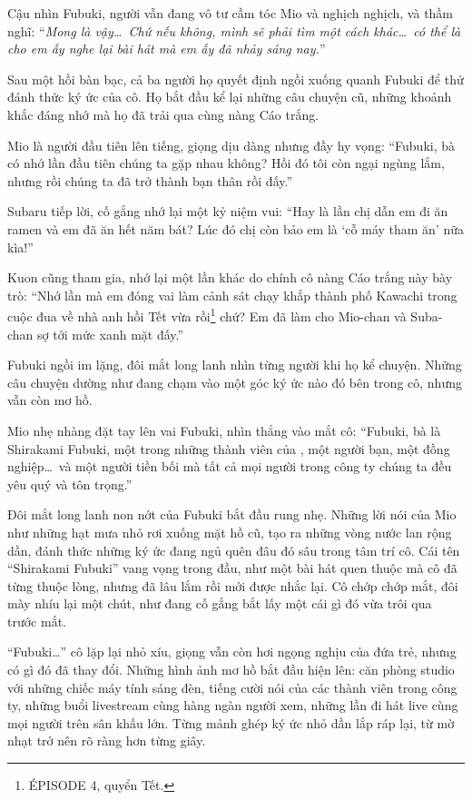 \documentclass[../main.tex]{subfiles}
\begin{document}
Cậu nhìn Fubuki, người vẫn đang vô tư cầm tóc Mio và nghịch nghịch, và thầm nghĩ: ``\textit{Mong là vậy\dots\ Chứ nếu không, mình sẽ phải tìm một cách khác\dots\ có thể là cho em ấy nghe lại bài hát mà em ấy đã nhảy sáng nay.}''

\ct

Sau một hồi bàn bạc, cả ba người họ quyết định ngồi xuống quanh Fubuki để thử đánh thức ký ức của cô. Họ bắt đầu kể lại những câu chuyện cũ, những khoảnh khắc đáng nhớ mà họ đã trải qua cùng nàng Cáo trắng.

Mio là người đầu tiên lên tiếng, giọng dịu dàng nhưng đầy hy vọng: ``Fubuki, bà có nhớ lần đầu tiên chúng ta gặp nhau không? Hồi đó tôi còn ngại ngùng lắm, nhưng rồi chúng ta đã trở thành bạn thân rồi đấy.''

Subaru tiếp lời, cố gắng nhớ lại một kỷ niệm vui: ``Hay là lần chị dẫn em đi ăn ramen và em đã ăn hết năm bát? Lúc đó chị còn bảo em là `cỗ máy tham ăn' nữa kìa!''

Kuon cũng tham gia, nhớ lại một lần khác do chính cô nàng Cáo trắng này bày trò: ``Nhớ lần mà em đóng vai làm cảnh sát chạy khắp thành phố Kawachi trong cuộc đua về nhà anh hồi Tết vừa rồi\footnote{{ÉPISODE 4}, quyển Tết.} chứ? Em đã làm cho Mio-chan và Suba-chan sợ tới mức xanh mặt đấy.''

Fubuki ngồi im lặng, đôi mắt long lanh nhìn từng người khi họ kể chuyện. Những câu chuyện dường như đang chạm vào một góc ký ức nào đó bên trong cô, nhưng vẫn còn mơ hồ.

Mio nhẹ nhàng đặt tay lên vai Fubuki, nhìn thẳng vào mắt cô: ``Fubuki, bà là Shirakami Fubuki, một trong những thành viên của \hll, một người bạn, một đồng nghiệp\dots\ và một người tiền bối mà tất cả mọi người trong công ty chúng ta đều yêu quý và tôn trọng.''

Đôi mắt long lanh non nớt của Fubuki bắt đầu rung nhẹ. Những lời nói của Mio như những hạt mưa nhỏ rơi xuống mặt hồ cũ, tạo ra những vòng nước lan rộng dần, đánh thức những ký ức đang ngủ quên đâu đó sâu trong tâm trí cô. Cái tên ``Shirakami Fubuki'' vang vọng trong đầu, như một bài hát quen thuộc mà cô đã từng thuộc lòng, nhưng đã lâu lắm rồi mới được nhắc lại. Cô chớp chớp mắt, đôi mày nhíu lại một chút, như đang cố gắng bắt lấy một cái gì đó vừa trôi qua trước mắt.

``Fubuki\dots'' cô lặp lại nhỏ xíu, giọng vẫn còn hơi ngọng nghịu của đứa trẻ, nhưng có gì đó đã thay đổi. Những hình ảnh mơ hồ bắt đầu hiện lên: căn phòng studio với những chiếc máy tính sáng đèn, tiếng cười nói của các thành viên trong công ty, những buổi livestream cùng hàng ngàn người xem, những lần đi hát live cùng mọi người trên sân khấu lớn. Từng mảnh ghép ký ức nhỏ dần lắp ráp lại, từ mờ nhạt trở nên rõ ràng hơn từng giây.
\end{document}
